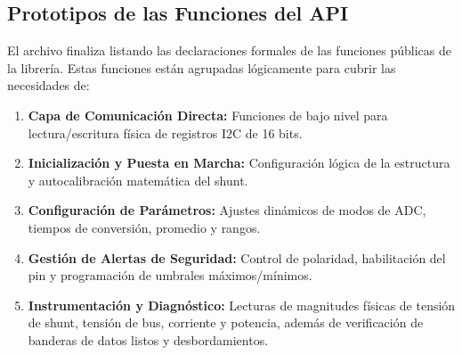 \documentclass[
10pt, %
a4paper, %
oneside, %
headinclude,footinclude, %
BCOR5mm, %
]{scrartcl}
\begin{document}
\subsection{Prototipos de las Funciones del API}
El archivo finaliza listando las declaraciones formales de las funciones públicas de la librería. Estas funciones están agrupadas lógicamente para cubrir las necesidades de:
\begin{enumerate}
	\item \textbf{Capa de Comunicación Directa:} Funciones de bajo nivel para lectura/escritura física de registros I2C de 16 bits.
	\item \textbf{Inicialización y Puesta en Marcha:} Configuración lógica de la estructura y autocalibración matemática del shunt.
	\item \textbf{Configuración de Parámetros:} Ajustes dinámicos de modos de ADC, tiempos de conversión, promedio y rangos.
	\item \textbf{Gestión de Alertas de Seguridad:} Control de polaridad, habilitación del pin y programación de umbrales máximos/mínimos.
	\item \textbf{Instrumentación y Diagnóstico:} Lecturas de magnitudes físicas de tensión de shunt, tensión de bus, corriente y potencia, además de verificación de banderas de datos listos y desbordamientos.
\end{enumerate}
\end{document}
